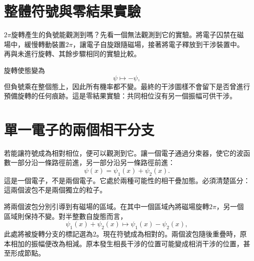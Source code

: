 \section{整體符號與零結果實驗}

\(2\pi\)旋轉產生的負號能觀測到嗎？先看一個無法觀測到它的實驗。將電子囚禁在磁場中，緩慢轉動裝置\(2\pi\)，讓電子自旋跟隨磁場，接著將電子釋放到干涉裝置中。再與未進行旋轉、其餘步驟相同的實驗比較。

旋轉使態變為
\begin{equation}
\psi\longmapsto-\psi,
\end{equation}
但負號乘在整個態上，因此所有機率都不變。最終的干涉圖樣不會留下是否曾進行預備旋轉的任何痕跡。這是零結果實驗：共同相位沒有另一個振幅可供干涉。

\begin{classroomqa}
\end{classroomqa}

\section{單一電子的兩個相干分支}

若能讓符號成為相對相位，便可以觀測到它。讓一個電子通過分束器，使它的波函數一部分沿一條路徑前進，另一部分沿另一條路徑前進：
\begin{equation}
\psi(x)=\psi_1(x)+\psi_2(x).
\end{equation}
這是一個電子，不是兩個電子。它處於兩種可能性的相干疊加態。必須清楚區分：這兩個波包不是兩個獨立的粒子。

將兩個波包分別引導到有磁場的區域。在其中一個區域內將磁場旋轉\(2\pi\)，另一個區域則保持不變。對半整數自旋態而言，
\begin{equation}
\psi_1(x)+\psi_2(x)
\longmapsto
\psi_1(x)-\psi_2(x),
\end{equation}
此處將被旋轉分支的標記選為\(2\)。現在符號成為相對的。兩個波包隨後重疊時，原本相加的振幅便改為相減。原本發生相長干涉的位置可能變成相消干涉的位置，甚至形成節點。

\begin{classroomqa}
\end{classroomqa}

